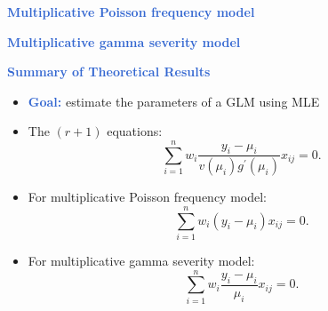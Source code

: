\documentclass[aspectratio=169,professionalfonts,mathserif,handout]{beamer}
\newcommand{\highlight}[1]{\textcolor{Highlight}{\bf #1}}
\renewcommand{\(}{\left(}
\renewcommand{\)}{\right)}
\renewcommand{\[}{\left[}
\renewcommand{\]}{\right]}
\newcommand{\mytitle}[1]{\vspace*{-1mm}%
  \centerline{\highlight{\Large #1}}\vspace*{3mm}}
\newenvironment{slidebox}{%
  \begin{minipage}[c][7.5cm][t]{14.4cm}\raggedright}{%
  \end{minipage}}
\begin{document}
\begin{frame}\begin{slidebox}
\mytitle{Multiplicative Poisson frequency model}

\end{slidebox}\end{frame}


\begin{frame}\begin{slidebox}
\mytitle{Multiplicative gamma severity model}

\end{slidebox}\end{frame}


\begin{frame}\begin{slidebox}
\mytitle{Summary of Theoretical Results}
\begin{itemize}
    \item \highlight{Goal:} estimate the parameters of a GLM using MLE
    \pause
    \item The $(r+1)$ equations:
    \begin{equation*}
      \sum_{i=1}^{n}w_{i}\frac{y_{i}-\mu_{i}}{v\left(  \mu_{i}\right)  g^{\prime
      }\left(  \mu_{i}\right)  }x_{ij}=0\text{.} 
    \end{equation*}
    \pause
    \item For multiplicative Poisson frequency model:
    \begin{equation*}
      \sum_{i=1}^{n}w_{i} (y_{i}-\mu_{i}) x_{ij} = 0 \text{.}
    \end{equation*}  
    \pause
    \item For multiplicative gamma severity model:
    \begin{equation*}
      \sum_{i=1}^{n}w_{i}\frac{y_{i}-\mu_{i}}{\mu_{i}}x_{ij}=0\text{.} 
    \end{equation*}
\end{itemize}
\end{slidebox}\end{frame}
\end{document}
